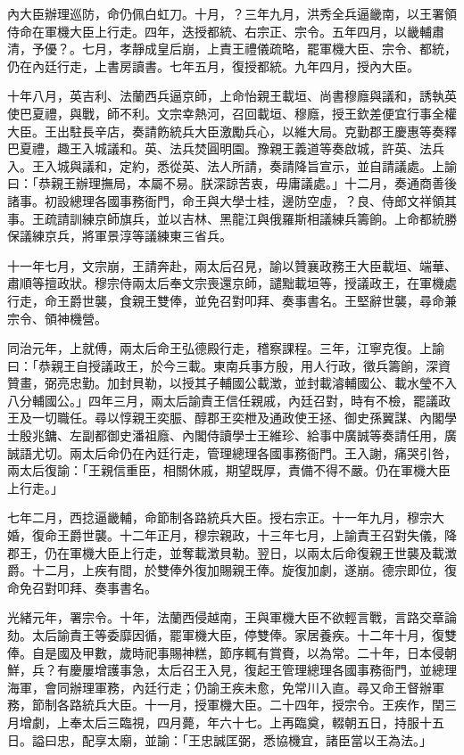 \begin{pinyinscope}
內大臣辦理巡防，命仍佩白虹刀。十月，？三年九月，洪秀全兵逼畿南，以王署領侍命在軍機大臣上行走。四年，迭授都統、右宗正、宗令。五年四月，以畿輔肅清，予優？。七月，孝靜成皇后崩，上責王禮儀疏略，罷軍機大臣、宗令、都統，仍在內廷行走，上書房讀書。七年五月，復授都統。九年四月，授內大臣。

十年八月，英吉利、法蘭西兵逼京師，上命怡親王載垣、尚書穆廕與議和，誘執英使巴夏禮，與戰，師不利。文宗幸熱河，召回載垣、穆廕，授王欽差便宜行事全權大臣。王出駐長辛店，奏請飭統兵大臣激勵兵心，以維大局。克勤郡王慶惠等奏釋巴夏禮，趣王入城議和。英、法兵焚圓明園。豫親王義道等奏啟城，許英、法兵入。王入城與議和，定約，悉從英、法人所請，奏請降旨宣示，並自請議處。上諭曰：「恭親王辦理撫局，本屬不易。朕深諒苦衷，毋庸議處。」十二月，奏通商善後諸事。初設總理各國事務衙門，命王與大學士桂，邊防空虛，？良、侍郎文祥領其事。王疏請訓練京師旗兵，並以吉林、黑龍江與俄羅斯相議練兵籌餉。上命都統勝保議練京兵，將軍景淳等議練東三省兵。

十一年七月，文宗崩，王請奔赴，兩太后召見，諭以贊襄政務王大臣載垣、端華、肅順等擅政狀。穆宗侍兩太后奉文宗喪還京師，譴黜載垣等，授議政王，在軍機處行走，命王爵世襲，食親王雙俸，並免召對叩拜、奏事書名。王堅辭世襲，尋命兼宗令、領神機營。

同治元年，上就傅，兩太后命王弘德殿行走，稽察課程。三年，江寧克復。上諭曰：「恭親王自授議政王，於今三載。東南兵事方殷，用人行政，徵兵籌餉，深資贊畫，弼亮忠勤。加封貝勒，以授其子輔國公載澂，並封載濬輔國公、載水瑩不入八分輔國公。」四年三月，兩太后諭責王信任親戚，內廷召對，時有不檢，罷議政王及一切職任。尋以惇親王奕脤、醇郡王奕枻及通政使王拯、御史孫翼謀、內閣學士殷兆鏞、左副都御史潘祖廕、內閣侍讀學士王維珍、給事中廣誠等奏請任用，廣誠語尤切。兩太后命仍在內廷行走，管理總理各國事務衙門。王入謝，痛哭引咎，兩太后復諭：「王親信重臣，相關休戚，期望既厚，責備不得不嚴。仍在軍機大臣上行走。」

七年二月，西捻逼畿輔，命節制各路統兵大臣。授右宗正。十一年九月，穆宗大婚，復命王爵世襲。十二年正月，穆宗親政，十三年七月，上諭責王召對失儀，降郡王，仍在軍機大臣上行走，並奪載澂貝勒。翌日，以兩太后命復親王世襲及載澂爵。十二月，上疾有間，於雙俸外復加賜親王俸。旋復加劇，遂崩。德宗即位，復命免召對叩拜、奏事書名。

光緒元年，署宗令。十年，法蘭西侵越南，王與軍機大臣不欲輕言戰，言路交章論劾。太后諭責王等委靡因循，罷軍機大臣，停雙俸。家居養疾。十二年十月，復雙俸。自是國及甲數，歲時祀事賜神糕，節序輒有賞賚，以為常。二十年，日本侵朝鮮，兵？有慶屢增護事急，太后召王入見，復起王管理總理各國事務衙門，並總理海軍，會同辦理軍務，內廷行走；仍諭王疾未愈，免常川入直。尋又命王督辦軍務，節制各路統兵大臣。十一月，授軍機大臣。二十四年，授宗令。王疾作，閏三月增劇，上奉太后三臨視，四月薨，年六十七。上再臨奠，輟朝五日，持服十五日。謚曰忠，配享太廟，並諭：「王忠誠匡弼，悉協機宜，諸臣當以王為法。」


\end{pinyinscope}
